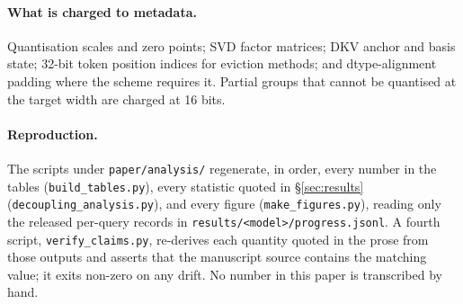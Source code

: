 \documentclass{article}
\theoremstyle{definition}
\begin{document}
\paragraph{What is charged to metadata.} Quantisation scales and zero points; SVD factor matrices; DKV anchor and basis state; 32-bit token position indices for eviction methods; and dtype-alignment padding where the scheme requires it. Partial groups that cannot be quantised at the target width are charged at 16 bits.

\paragraph{Reproduction.} The scripts under \texttt{paper/analysis/} regenerate, in order, every number in the tables (\texttt{build\_tables.py}), every statistic quoted in \S\ref{sec:results} (\texttt{decoupling\_analysis.py}), and every figure (\texttt{make\_figures.py}), reading only the released per-query records in \texttt{results/<model>/progress.jsonl}. A fourth script, \texttt{verify\_claims.py}, re-derives each quantity quoted in the prose from those outputs and asserts that the manuscript source contains the matching value; it exits non-zero on any drift. No number in this paper is transcribed by hand.
\end{document}
